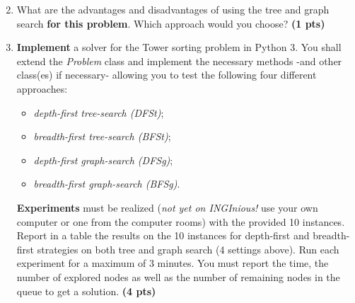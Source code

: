 \documentclass[11pt,a4paper]{report}
\begin{document}
\begin{enumerate}
\setcounter{enumi}{1}
\begin{enumerate}
\setcounter{enumii}{1}
    \item What are the advantages and disadvantages of using the tree and graph search \textbf{for this problem}. Which approach would you choose? \textbf{(1 pts)}
\end{enumerate}
\end{enumerate}

\begin{answers}[4cm]
\end{answers}



\begin{enumerate}
\setcounter{enumi}{2}
    \item \textbf{Implement} a solver for the Tower sorting problem in Python 3.
    You shall extend the \emph{Problem} class and implement the necessary methods -and other class(es) if necessary- allowing you to test the following four different approaches: 
    \begin{itemize}
    	\item \textit{depth-first tree-search (DFSt)};
    	\item \textit{breadth-first tree-search (BFSt)};
    	\item \textit{depth-first graph-search (DFSg)};
    	\item \textit{breadth-first graph-search (BFSg)}. 
    \end{itemize}
    \textbf{Experiments} must be realized (\textit{not yet on INGInious!} use your own computer or one from the computer rooms) with the provided 10 instances. 
    Report in a table the results on the 10 instances for depth-first and breadth-first strategies on both tree and graph search (4 settings above). 
    Run each experiment for a maximum of 3 minutes. 
    You must report the time, the number of explored nodes as well as the number of remaining nodes in the queue to get a solution. \textbf{(4 pts)}
\end{enumerate}
\end{document}
